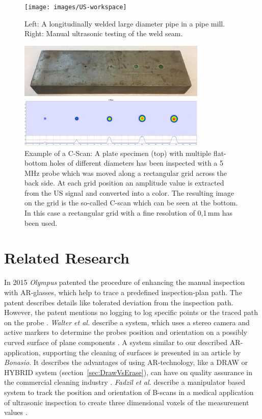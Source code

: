 \documentclass{VRARWorkshop}
\begin{document}
\begin{figure}[h!]
    \begin{center}
        \texttt{[image: images/US-workspace]}
        \caption{\label{fig:manual_UT} Left: A longitudinally welded large diameter pipe in a pipe mill.
				Right: Manual ultrasonic testing of the weld seam.}
    \end{center}
\end{figure}
\begin{figure}[h!]
    \begin{center}
        \includegraphics[width=0.8\textwidth]{images/CScan}
        \caption{\label{fig:cScan}
        Example of a C-Scan: A plate specimen (top) with multiple flat-bottom holes of different diameters has been inspected with a 5 MHz probe which was moved along a rectangular grid across the back side.
        At each grid position an amplitude value is extracted from the US signal and converted into a color.
        The resulting image on the grid is the so-called C-scan which can be seen at the bottom.
				In this case a rectangular grid with a fine resolution of 0,1\,mm has been used.
        }
    \end{center}
\end{figure}

\section{Related Research}
In 2015 \textit{Olympus} patented the procedure of enhancing the manual inspection with AR-glasses, which help to trace a predefined inspection-plan path.
The patent describes details like tolerated deviation from the inspection path.
However, the patent mentions no logging to log specific points or the traced path on the probe \cite{ARPat15}.
\textit{Walter et al.} describe a system, which uses a stereo camera and active markers to determine the probes position and orientation on a possibly curved surface of plane components \cite{walter_non-contact_2017}.
A system similar to our described AR-application, supporting the cleaning of surfaces is presented in an article by \textit{Bonasio}.
It describes the advantages of using AR-technology, like a DRAW or HYBRID system (section~\ref{sec:DrawVsErase}), can have on quality assurance in the commercial cleaning industry \cite{ARClean}.
\textit{Fadzil et al.} describe a manipulator based system to track the position and orientation of B-scans in a medical application of ultrasonic inspection to create three dimensional voxels of the measurement values \cite{fadzil_design_2015}.
\end{document}
